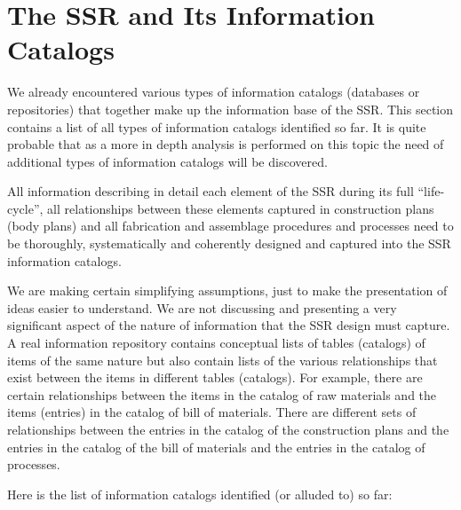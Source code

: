 \section{The SSR and Its Information Catalogs}

We already encountered various types of information catalogs (databases
or repositories) that together make up the information base of the SSR.
This section contains a list of all types of information catalogs
identified so far. It is quite probable that as a more in depth
analysis is performed on this topic the need of additional types of
information catalogs will be discovered.

All information describing in detail each element of the SSR during its
full “life-cycle”, all relationships between these elements captured in
construction plans (body plans) and all fabrication and assemblage
procedures and processes need to be thoroughly, systematically and
coherently designed and captured into the SSR information catalogs.

We are making certain simplifying assumptions, just to make the
presentation of ideas easier to understand. We are not discussing and
presenting a very significant aspect of the nature of information that
the SSR design must capture. A real information repository contains
conceptual lists of tables (catalogs) of items of the same nature but
also contain lists of the various relationships that exist between the
items in different tables (catalogs).  For example, there are certain
relationships between the items in the catalog of raw materials and the
items (entries) in the catalog of bill of materials. There are
different sets of relationships between the entries in the catalog of
the construction plans and the entries in the catalog of the bill of
materials and the entries in the catalog of processes.

Here is the list of information catalogs identified (or alluded to) so
far:

